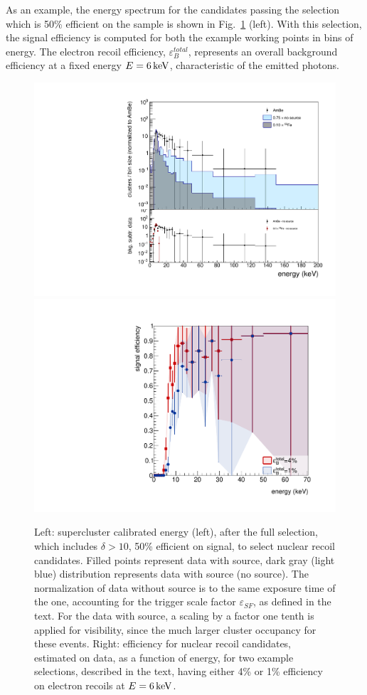 As an example, the energy spectrum for the candidates passing the
selection which is 50\% efficient on the \ambe sample is shown in
Fig.~\ref{fig:fullsel_effi} (left). With this selection, the signal
efficiency is computed for both the example working points in bins of
energy. The electron recoil efficiency, $\varepsilon_{B}^{total}$,
represents an overall background efficiency at a fixed energy
$E=6\,\textrm{ke\hspace{-.08em}V}$, characteristic of the \fe emitted photons.
%
\begin{figure}[ht]
  \begin{center}
    \includegraphics[width=0.45\linewidth]{figures/energyFull_WP50}
    \includegraphics[width=0.45\linewidth]{figures/energyFull_effi}

    \caption{Left: supercluster calibrated energy (left), after the
      full selection, which includes $\delta>10$, 50\% efficient on
      signal, to select nuclear recoil candidates.  Filled points
      represent data with \ambe source, dark gray (light blue)
      distribution represents data with \fe source (no source).  The
      normalization of data without source is to the same exposure
      time of the \ambe one, accounting for the trigger scale factor
      $\varepsilon_{SF}$, as defined in the text. For the data with
      \fe source, a scaling by a factor one tenth is applied for
      visibility, since the much larger cluster occupancy for these
      events. Right: efficiency for nuclear recoil candidates,
      estimated on \ambe data, as a function of energy, for two
      example selections, described in the text, having either 4\% or
      1\% efficiency on electron recoils at
      $E=6\,\textrm{ke\hspace{-.08em}V}$. \label{fig:fullsel_effi}}

  \end{center}
\end{figure}
